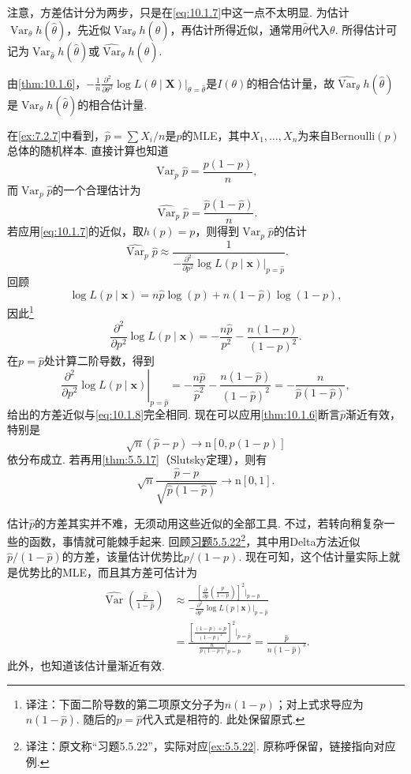 注意，方差估计分为两步，只是在\eqref{eq:10.1.7}中这一点不太明显. 为估计$\operatorname{Var}_\theta h(\hat\theta)$，先近似$\operatorname{Var}_\theta h(\hat\theta)$，再估计所得近似，通常用$\hat\theta$代入$\theta$. 所得估计可记为$\operatorname{Var}_{\hat\theta}h(\hat\theta)$或$\widehat{\operatorname{Var}}_\theta h(\hat\theta)$.

由\autoref{thm:10.1.6}，$-\frac1n\frac{\partial^2}{\partial\theta^2}\log L(\theta\mid\boldsymbol X)|_{\theta=\hat\theta}$是$I(\theta)$的相合估计量，故$\widehat{\operatorname{Var}}_\theta h(\hat\theta)$是$\operatorname{Var}_\theta h(\hat\theta)$的相合估计量.

\begin{example}[近似二项方差]\label{ex:10.1.14}
在\autoref{ex:7.2.7}中看到，$\hat p=\sum X_i/n$是$p$的MLE，其中$X_1,\ldots,X_n$为来自Bernoulli$(p)$总体的随机样本. 直接计算也知道
$$\operatorname{Var}_p\hat p=\frac{p(1-p)}n,$$
而$\operatorname{Var}_p\hat p$的一个合理估计为
\begin{equation}\label{eq:10.1.8}
\widehat{\operatorname{Var}}_p\hat p=\frac{\hat p(1-\hat p)}n.
\end{equation}
若应用\eqref{eq:10.1.7}的近似，取$h(p)=p$，则得到$\operatorname{Var}_p\hat p$的估计
$$\widehat{\operatorname{Var}}_p\hat p\approx\frac1{-\frac{\partial^2}{\partial p^2}\log L(p\mid\boldsymbol x)|_{p=\hat p}}.$$
回顾
$$\log L(p\mid\boldsymbol x)=n\hat p\log(p)+n(1-\hat p)\log(1-p),$$
因此\footnote{译注：下面二阶导数的第二项原文分子为$n(1-p)$；对上式求导应为$n(1-\hat p)$. 随后的$p=\hat p$代入式是相符的. 此处保留原式.}
$$\frac{\partial^2}{\partial p^2}\log L(p\mid\boldsymbol x)=-\frac{n\hat p}{p^2}-\frac{n(1-p)}{(1-p)^2}.$$
在$p=\hat p$处计算二阶导数，得到
$$\left.\frac{\partial^2}{\partial p^2}\log L(p\mid\boldsymbol x)\right|_{p=\hat p}
=-\frac{n\hat p}{\hat p^2}-\frac{n(1-\hat p)}{(1-\hat p)^2}=-\frac n{\hat p(1-\hat p)},$$
给出的方差近似与\eqref{eq:10.1.8}完全相同. 现在可以应用\autoref{thm:10.1.6}断言$\hat p$渐近有效，特别是
$$\sqrt n(\hat p-p)\longrightarrow\mathrm n[0,p(1-p)]$$
依分布成立. 若再用\autoref{thm:5.5.17}（Slutsky定理），则有
$$\sqrt n\frac{\hat p-p}{\sqrt{\hat p(1-\hat p)}}\longrightarrow\mathrm n[0,1].$$

估计$\hat p$的方差其实并不难，无须动用这些近似的全部工具. 不过，若转向稍复杂一些的函数，事情就可能棘手起来. 回顾\hyperref[ex:5.5.22]{习题5.5.22}\footnote{译注：原文称“习题5.5.22”，实际对应\autoref{ex:5.5.22}. 原称呼保留，链接指向对应例.}，其中用Delta方法近似$\hat p/(1-\hat p)$的方差，该量估计优势比$p/(1-p)$. 现在可知，这个估计量实际上就是优势比的MLE，而且其方差可估计为
$$\begin{aligned}
\widehat{\operatorname{Var}}\left(\frac{\hat p}{1-\hat p}\right)
&\approx\frac{\left[\frac\partial{\partial p}\left(\frac p{1-p}\right)\right]^2\big|_{p=\hat p}}{-\frac{\partial^2}{\partial p^2}\log L(p\mid\boldsymbol x)|_{p=\hat p}}\\
&=\frac{\left[\frac{(1-p)+p}{(1-p)^2}\right]^2\big|_{p=\hat p}}{\frac n{p(1-p)}\big|_{p=\hat p}}
=\frac{\hat p}{n(1-\hat p)^3}.
\end{aligned}$$
此外，也知道该估计量渐近有效.
\end{example}

